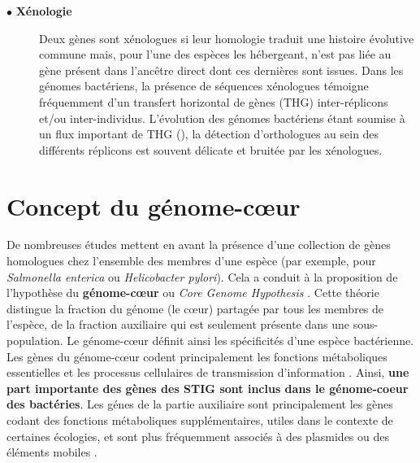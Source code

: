 \begin{description}
\item[$\bullet$ \textbf{Xénologie}] Deux gènes sont xénologues si leur homologie traduit une histoire évolutive commune mais, pour l'une des espèces les hébergeant, n'est pas liée au gène présent dans l'ancêtre direct dont ces dernières sont issues. Dans les génomes bactériens, la présence de séquences xénologues témoigne fréquemment d'un transfert horizontal de gènes (THG) inter-réplicons et/ou inter-individus. L'évolution des génomes bactériens étant soumise à un flux important de THG (\citep{Bapteste2009,Doolittle2007}), la détection d'orthologues au sein des différents réplicons est souvent délicate et bruitée par les xénologues.
\end{description} 


\section{Concept du génome-cœur}\label{coregenome}
De nombreuses études mettent en avant la présence d'une collection de gènes homologues chez l'ensemble des membres d'une espèce (par exemple, pour \textit{Salmonella enterica} \citep{lan2009population} ou \textit{Helicobacter pylori}). Cela a conduit à la proposition de l'hypothèse du \textbf{génome-cœur} ou \textit{Core Genome Hypothesis} \citep{lan1996gene}. Cette théorie distingue la fraction du génome (le cœur) partagée par tous les membres de l'espèce, de la fraction auxiliaire qui est seulement présente dans une sous-population. Le génome-cœur définit ainsi les spécificités d'une espèce bactérienne. Les gènes du génome-cœur codent principalement les fonctions métaboliques essentielles et les processus cellulaires de transmission d'information \citep{Riley2009}. Ainsi, \textbf{une part importante des gènes des STIG sont inclus dans le génome-coeur des bactéries}. Les génes de la partie auxiliaire sont principalement les gènes codant des fonctions métaboliques supplémentaires, utiles dans le contexte de certaines écologies, et sont plus fréquemment associés à des plasmides ou des éléments mobiles \citep{Riley2009}.


